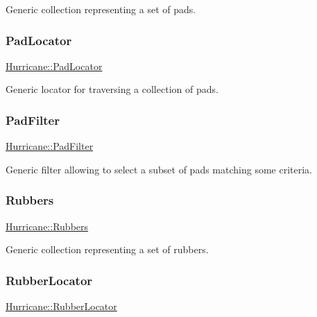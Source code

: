 Generic collection representing a set of pads. \mbox{\label{namespaceHurricane_a733c2eb75cde14a8b6a2e62edfbd2792}} 
\subsubsection{\texorpdfstring{Pad\+Locator}{PadLocator}}
{\footnotesize\ttfamily \mbox{\hyperlink{namespaceHurricane_a733c2eb75cde14a8b6a2e62edfbd2792}{Hurricane\+::\+Pad\+Locator}}}

Generic locator for traversing a collection of pads. \mbox{\label{namespaceHurricane_aeff6d8148675fc30f366906bfc652c25}} 
\subsubsection{\texorpdfstring{Pad\+Filter}{PadFilter}}
{\footnotesize\ttfamily \mbox{\hyperlink{namespaceHurricane_aeff6d8148675fc30f366906bfc652c25}{Hurricane\+::\+Pad\+Filter}}}

Generic filter allowing to select a subset of pads matching some criteria. \mbox{\label{namespaceHurricane_af8923abd57508cc44931a00d61b564ad}} 
\subsubsection{\texorpdfstring{Rubbers}{Rubbers}}
{\footnotesize\ttfamily \mbox{\hyperlink{namespaceHurricane_af8923abd57508cc44931a00d61b564ad}{Hurricane\+::\+Rubbers}}}

Generic collection representing a set of rubbers. \mbox{\label{namespaceHurricane_ae4f27278e942109c3c47ad1b741f9df3}} 
\subsubsection{\texorpdfstring{Rubber\+Locator}{RubberLocator}}
{\footnotesize\ttfamily \mbox{\hyperlink{namespaceHurricane_ae4f27278e942109c3c47ad1b741f9df3}{Hurricane\+::\+Rubber\+Locator}}}

